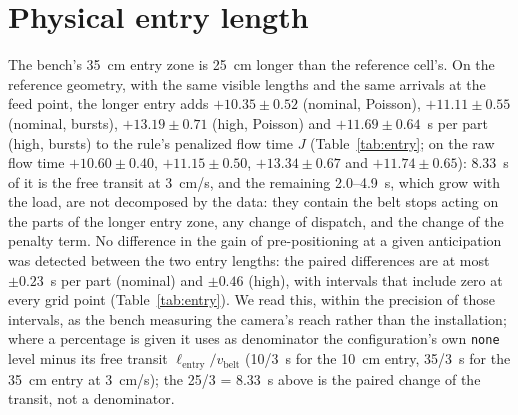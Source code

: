 \documentclass[11pt,a4paper]{article}
\newcommand{\nj}{\textsc{nj}}
\newcommand{\vb}{v_{\mathrm{belt}}}
\begin{document}
\section{Physical entry length}\label{sup:entry}
The bench's 35~cm entry zone is 25~cm longer than the reference cell's. On the reference
geometry, with the same visible lengths and the same arrivals at the feed point, the
longer entry adds $+10.35\pm0.52$ (nominal, Poisson), $+11.11\pm0.55$ (nominal, bursts),
$+13.19\pm0.71$ (high, Poisson) and $+11.69\pm0.64$~s per part (high, bursts) to the
rule's penalized flow time $J$ (Table~\ref{tab:entry}; on the raw flow time $+10.60\pm0.40$,
$+11.15\pm0.50$, $+13.34\pm0.67$ and $+11.74\pm0.65$): 8.33~s of it is the free transit at
3~cm/s, and the remaining 2.0--4.9~s, which grow with the load, are not decomposed by
the data: they contain the belt stops acting on the parts of the longer entry zone, any
change of dispatch, and the change of the penalty term. No difference in the gain of pre-positioning at a given anticipation was detected
between the two entry lengths: the paired differences are at most $\pm0.23$~s per part
(nominal) and $\pm0.46$ (high), with intervals that include zero at every grid point
(Table~\ref{tab:entry}). We read this, within the precision of those intervals, as the
bench measuring the camera's reach rather than the installation; where a percentage is given it uses as denominator the configuration's own \texttt{none} level minus its free transit $\ell_{\mathrm{entry}}/\vb$ (10/3~s for the 10~cm entry, 35/3~s for the 35~cm entry at 3~cm/s); the 25/3 = 8.33~s above is the paired change of the transit, not a denominator.

\begin{table}[t]
\centering\small
\caption{Physical-length check, \nj, reference geometry ($d=12$~cm, $v_x=v_y=10$~cm/s):
the 35~cm entry against the 10~cm entry, same visible lengths, same arrivals at the feed
point. $\Delta$ `none' level: penalized flow time $J$ added by the longer entry; $\Delta G$: difference
of the pre-positioning gain at the same anticipation (35~cm minus 10~cm), paired, 95\,\%
CI.}
\label{tab:entry}
\resizebox{\linewidth}{!}{}
\end{table}

\end{document}
